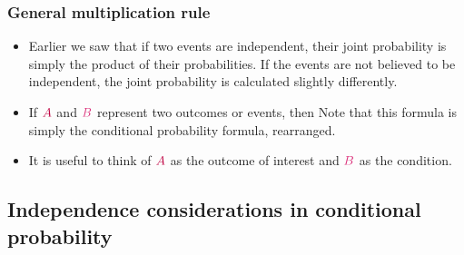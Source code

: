 \documentclass[notes,11pt, aspectratio=169]{beamer}
\begin{document}
\begin{frame}
\frametitle{General multiplication rule}

\begin{itemize}

\item Earlier we saw that if two events are independent, their joint probability is simply the product of their probabilities. If the events are not believed to be independent, the joint probability is calculated slightly differently.

\pause

\item If $\textcolor{purple}{A}$ and $\textcolor{pink}{B}$ represent two outcomes or events, then
\formula{\[ P(\textcolor{purple}{A}~and~\textcolor{pink}{B}) = P(\textcolor{purple}{A}|\textcolor{pink}{B}) \times P(\textcolor{pink}{B}) \]}
Note that this formula is simply the conditional probability formula, rearranged.

\pause

\item It is useful to think of $\textcolor{purple}{A}$ as the outcome of interest and $\textcolor{pink}{B}$ as the condition.

\end{itemize}

\end{frame}


\subsection{Independence considerations in conditional probability}

\end{document}
